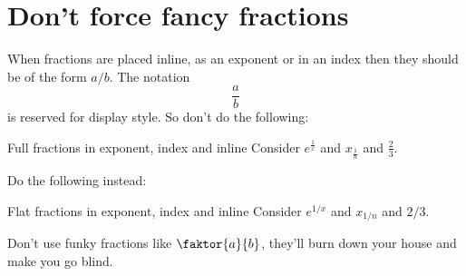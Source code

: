 \section{Don’t force fancy fractions}

When fractions are placed inline, as an exponent or in an index then they should be of the form $a/b$.
The notation
\[
  \frac{a}{b}
\]
is reserved for display style.
So don’t do the following:
\begin{showlatex}{Full fractions in exponent, index and inline}
Consider $e^{\frac{1}{x}}$ and $x_{\frac{1}{n}}$ and $\frac{2}{3}$.
\end{showlatex}
Do the following instead:
\begin{showlatex}{Flat fractions in exponent, index and inline}
Consider $e^{1/x}$ and $x_{1/n}$ and $2/3$.
\end{showlatex}

Don’t use funky fractions like $\faktor{a}{b}$, they’ll burn down your house and make you go blind.





